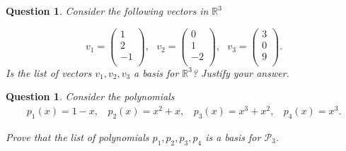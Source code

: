 \documentclass[12pt]{article}
\newtheorem{question}[thm]{Question}
\def\P{\mathcal P}
\def\R{\mathbb R}
\begin{document}
\begin{question}
    \normalfont
    Consider the following vectors in $\R^3$

    $$ v_1 =  \left( \begin{array}{c}
                1  \\
                2  \\
                -1 \\
            \end{array} \right),\ \ \   v_2 =  \left( \begin{array}{c}
                0  \\
                1  \\
                -2 \\
            \end{array}\right), \ \ \
        v_3 =  \left( \begin{array}{c}
                3 \\
                0 \\
                9 \\
            \end{array} \right). $$
    Is the list of vectors $v_1, v_2, v_3$ \hspace{.1cm} a basis for $\R^3$? Justify your answer.

\end{question}
\vspace{1cm}
\begin{question}
    \normalfont

    Consider the polynomials
    \begin{align*}
        p_1(x) = 1-x,\ \ \ \ p_2(x)=x^2+x,\ \ \ \ p_3(x)=x^3+x^2,\ \ \ \ p_4(x)=x^3.
    \end{align*}

    Prove that the list of polynomials $p_1, p_2, p_3, p_4$ \hspace{.1cm} is a basis for $\P_3$.


\end{question}






\end{document}
